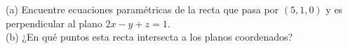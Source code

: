 \item (a) Encuentre ecuaciones paramétricas de la recta que pasa por $(5, 1, 0)$ y es perpendicular al plano $2x - y + z = 1$. \\
    (b) ¿En qué puntos esta recta intersecta a los planos coordenados?
